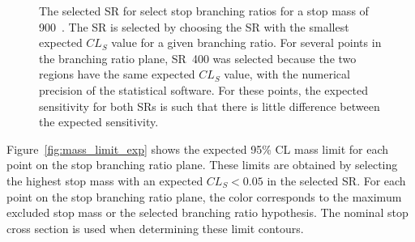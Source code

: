 \begin{figure}[ht]
  \centering
  \caption{
    The selected SR for select stop branching ratios for a stop mass of
    900~\GeV.
    The SR is selected by choosing the SR with the smallest expected $CL_S$
    value for a given branching ratio.
    For several points in the branching ratio plane, SR~400 was selected because
    the two regions have the same expected $CL_S$ value, with the numerical
    precision of the statistical software.
    For these points, the expected sensitivity for both SRs is such that
    there is little difference between the expected sensitivity.
  }
  \label{fig:sr_selection}
\end{figure}

Figure~\ref{fig:mass_limit_exp} shows the expected 95\% CL mass limit for each
point on the stop branching ratio plane.
These limits are obtained by selecting the highest stop mass with an expected
$CL_S < 0.05$ in the selected SR.
For each point on the stop branching ratio plane, the color corresponds to the
maximum excluded stop mass or the selected branching ratio hypothesis.
The nominal stop cross section is used when determining these limit contours.

